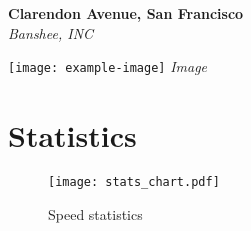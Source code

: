\documentclass[letterpaper]{article}
\begin{document}
\begin{center}
    {\huge \textbf{ Clarendon Avenue, San Francisco}}\\
    \vspace{0.1cm}
    {\large \textit{Banshee, INC}}
\end{center}

\begin{multicols}{2}

\lipsum[1-2]
\begin{center}
    \texttt{[image: example-image]} %
    \textit{Image}
\end{center}




\section*{Statistics}

\vspace{0.5cm}


\end{multicols}

\begin{center}
\begin{figure}[ht]
    \centering
    \texttt{[image: stats\_chart.pdf]}
    \caption{Speed statistics}
\end{figure}
\end{center}
\end{document}
